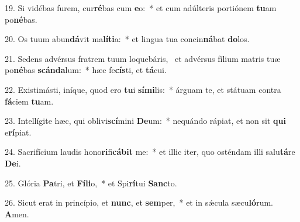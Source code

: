 19. Si vidébas furem, cur\textbf{ré}bas cum \textbf{e}o:~*  et cum adúlteris portiónem \textbf{tu}am po\textbf{né}bas.\

20. Os tuum abun\textbf{dá}vit ma\textbf{lí}\textbf{ti}a:~*  et lingua tua concin\textbf{ná}bat \textbf{do}los.\

21. Sedens advérsus fratrem tuum loquebáris, \dag\  et advérsus fílium matris tuæ po\textbf{né}bas \textbf{scán}\textbf{da}lum:~*  hæc fe\textbf{cís}ti, et \textbf{tá}cui.\

22. Existimásti, iníque, quod ero \textbf{tu}i \textbf{sí}\textbf{mi}lis:~*  árguam te, et státuam contra \textbf{fá}ciem \textbf{tu}am.\

23. Intellígite hæc, qui oblivi\textbf{scí}mini \textbf{De}um:~*  nequándo rápiat, et non sit \textbf{qui} e\textbf{rí}piat.\

24. Sacrifícium laudis hono\textbf{ri}fi\textbf{cá}\textbf{bit} me:~*  et illic iter, quo osténdam illi salu\textbf{tá}re \textbf{De}i.\

25. Glória \textbf{Pa}tri, et \textbf{Fí}\textbf{li}o,~*  et Spi\textbf{rí}tui \textbf{Sanc}to.\

26. Sicut erat in princípio, et \textbf{nunc}, et \textbf{sem}per,~*  et in sǽcula sæcu\textbf{ló}rum. \textbf{A}men.\

